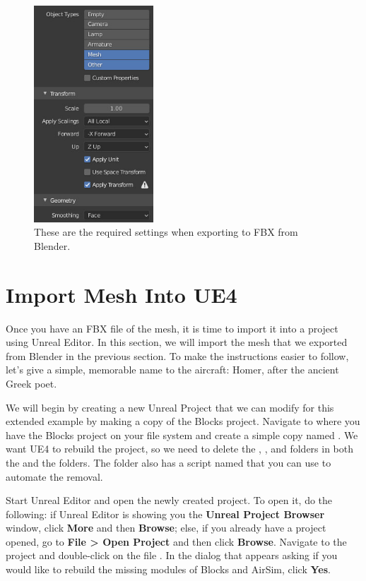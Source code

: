 \begin{figure}[t]
    \centering
    \includegraphics[height=230pt]{figures/blender_fbx_export}
    \caption[The required FBX export settings in Blender]{
        These are the required settings when exporting to FBX from Blender.}%
    \label{fig:blender_fbx_export}
\end{figure}

\section{Import Mesh Into UE4}\label{sec:import_mesh_ue4}
Once you have an FBX file of the mesh, it is time to import it into a project using Unreal Editor. In this section, we will import the mesh that we exported from Blender in the previous section. To make the instructions easier to follow, let's give a simple, memorable name to the aircraft: Homer, after the ancient Greek poet.

We will begin by creating a new Unreal Project that we can modify for this extended example by making a copy of the Blocks project. Navigate to where you have the Blocks project on your file system and create a simple copy named . We want UE4 to rebuild the project, so we need to delete the , , and  folders in both the  and the  folders. The  folder also has a script named  that you can use to automate the removal.

Start Unreal Editor and open the newly created project. To open it, do the following: if Unreal Editor is showing you the \textbf{Unreal Project Browser} window, click \textbf{More} and then \textbf{Browse}; else, if you already have a project opened, go to \textbf{File > Open Project} and then click \textbf{Browse}. Navigate to the  project and double-click on the file . In the dialog that appears asking if you would like to rebuild the missing modules of Blocks and AirSim, click \textbf{Yes}.


